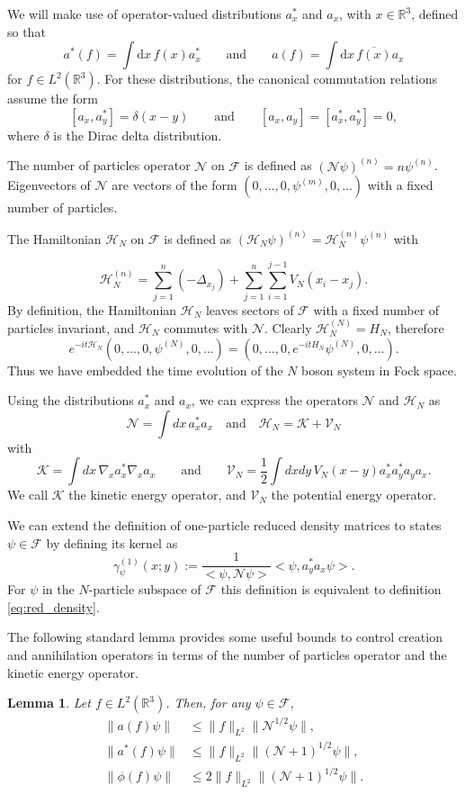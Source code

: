 \documentclass[11pt,a4paper,draft,DIV11]{scrartcl}	%
\newtheorem{lem}[thm]{Lemma}
\newcommand{\R}{\mathds{R}}
\newcommand{\N}{\mathcal{N}}
\newcommand{\K}{\mathcal{K}}
\newcommand{\fock}{\mathcal{F}}		%
\newcommand{\di}{\textrm{d}}		%
\newcommand{\Ncal}{\mathcal{N}}		%
\newcommand{\Hcal}{\mathcal{H}}		%
\newcommand{\scal}[2]{\big<#1,#2\big>} %
\newcommand{\cc}[1]{\overline{#1}}	%
\newcommand{\norm}[1]{\lVert#1\rVert}	%
\newcommand{\be}[1]{\begin{equation}\label{eq:#1}}	%
\newcommand{\ee}{\end{equation}}
\newcommand{\todo}[1]{}
\newcommand{\eqr}[1]{\eqref{eq:#1}}			%
\begin{document}
We will make use of operator-valued distributions $a_x^*$ and $a_x$, with $x
\in \R^3$, defined so that
\[
  a^*(f) = \int \di x\, f(x) a^*_x \qquad \text{and} \qquad a(f) = \int \di
  x\, \cc{f(x)} a_x
\]
for $f \in L^2(\R^3)$. For these distributions, the canonical commutation
relations assume the form
\[
  [a_x, a_y^*] = \delta(x-y) \qquad \text{and} \qquad [a_x, a_y] = [a_x^*,
  a_y^*] = 0,
\]
where $\delta$ is the Dirac delta distribution.


The number of particles operator $\mathcal{N}$ on $\mathcal{F}$ is defined as
$(\N \psi)^{(n)} = n \psi^{(n)}$. Eigenvectors of $\N$ are vectors of the form
$(0, \dots, 0, \psi^{(m)}, 0, \dots )$ with a fixed number of particles.


The Hamiltonian $\Hcal_N$ on $\mathcal{F}$ is defined as $(\Hcal_N
\psi)^{(n)} = \Hcal_N^{(n)} \psi^{(n)}$ with
\todo{Double sum inconsistent with single sum in other places.}
\[
  \Hcal_N^{(n)} = \sum_{j=1}^n (-\Delta_{x_j}) + \sum_{j=1}^n
  \sum_{i=1}^{j-1} V_N(x_i - x_j).
\]
By definition, the Hamiltonian $\Hcal_N$ leaves sectors of $\fock$ with a
fixed number of particles invariant, and $\Hcal_N$ commutes with $\N$.
Clearly $\Hcal_N^{(N)} = H_N$, therefore
\[
e^{-it \Hcal_N} (0,\dots,0, \psi^{(N)},0,\dots) = (0,\dots,0,
e^{-itH_N}\psi^{(N)},0,\dots).
\]
Thus we have embedded the time evolution of the $N$ boson system in Fock space.

Using the distributions $a_x^*$ and $a_x$, we can express the operators $\N$
and $\Hcal_N$ as
\[
  \N = \int dx \, a_x^* a_x \quad \mbox{and} \quad
  \Hcal_N = \K + \mathcal{V}_N
\]
with
\[
  \K = \int dx \, \nabla_x a_x^* \nabla_x a_x \qquad \text{and} \qquad
  \mathcal{V}_N = \frac{1}{2} \int dx dy \, V_N(x-y) a_x^* a_y^* a_y a_x.
\]
We call $\K$ the kinetic energy operator, and $\mathcal{V}_N$ the potential
energy operator.

We can extend the definition of one-particle reduced density matrices to states $\psi \in \fock$ by defining its kernel as
\be{fock_density}
\gamma_{\psi}^{(1)}(x;y) := \frac{1}{\scal{\psi}{\Ncal \psi}} \scal{\psi}{a^\ast_y a_x \psi}.
\ee
For $\psi$ in the $N$-particle subspace of $\fock$ this definition is equivalent to definition \eqr{red_density}.

The following standard lemma provides some useful bounds to control creation and
annihilation operators in terms of the number of particles operator and the
kinetic energy operator.


\begin{lem} \label{l:a}
  Let $f \in L^2(\R^3)$. Then, for any $\psi \in
  \mathcal{F}$,
  \begin{equation} \label{aNorm}
    \begin{aligned}
      \norm{a(f)\psi} & \leq \norm{f}_{L^2} \norm{\Ncal^{1/2}\psi}, \\
      \norm{a^*(f)\psi} & \leq \norm{f}_{L^2} \norm{(\Ncal+1)^{1/2}\psi}, \\
      \norm{\phi(f) \psi} & \leq 2 \norm{f}_{L^2} \norm{(\N+1)^{1/2} \psi}.
    \end{aligned}
  \end{equation}
\end{lem}
\end{document}
